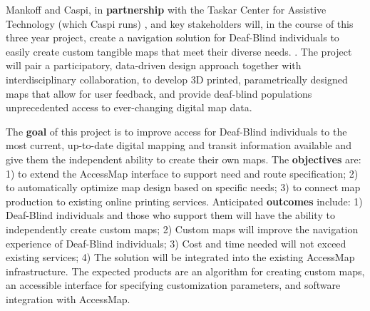 Mankoff and Caspi, in \textbf{partnership} with the Taskar Center for Assistive Technology  (which Caspi runs) , and key stakeholders will, in the course of this three year project, create a navigation solution for Deaf-Blind individuals to easily create custom tangible maps that meet their diverse needs. .
 The project will pair a participatory, data-driven design approach together with interdisciplinary collaboration, to develop 3D printed, parametrically designed maps that allow for user feedback, and provide deaf-blind populations unprecedented access to ever-changing digital map data.


The \textbf{goal} of this project is to improve access for Deaf-Blind individuals to the most current, up-to-date digital mapping and transit information available
and give them the independent ability to create their own maps.  The \textbf{objectives} are: 1) to extend the AccessMap interface to support need and route specification; 2) to automatically optimize map design based on specific needs; 3) to connect map production to existing online printing services. Anticipated \textbf{outcomes} include: 1) Deaf-Blind individuals and those who support them will have the ability to independently create custom maps; 2) Custom maps will improve the navigation experience of Deaf-Blind individuals; 3) Cost and time needed will not exceed existing services; 4) The solution will be integrated into the existing AccessMap infrastructure. The expected products are an algorithm for creating custom maps, an accessible interface for specifying customization parameters, and software integration with AccessMap. 